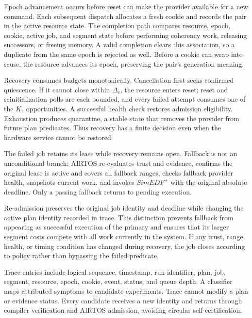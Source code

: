 \documentclass[lettersize,journal]{IEEEtran}
\begin{document}
Epoch advancement occurs before reset can make the provider available for a
new command. Each subsequent dispatch allocates a fresh cookie and records the
pair in the active resource state. The completion path compares resource,
epoch, cookie, active job, and segment state before performing coherency work,
releasing successors, or freeing memory. A valid completion clears this
association, so a duplicate from the same epoch is rejected as well. Before a
cookie can wrap into reuse, the resource advances its epoch, preserving the
pair's generation meaning.

Recovery consumes budgets monotonically. Cancellation first seeks confirmed
quiescence. If it cannot close within $\Delta_c$, the resource enters reset;
reset and reinitialization polls are each bounded, and every failed attempt
consumes one of the $K_r$ opportunities. A successful health check restores
admission eligibility. Exhaustion produces quarantine, a stable state that
removes the provider from future plan predicates. Thus recovery has a finite
decision even when the hardware service cannot be restored.

The failed job retains its lease while recovery remains open. Fallback is not
an unconditional branch: AIRTOS re-evaluates trust and evidence, confirms the
original lease is active and covers all fallback ranges, checks fallback
provider health, snapshots current work, and invokes $SimEDF^+$ with the
original absolute deadline. Only a passing fallback returns to pending
execution.

Re-admission preserves the original job identity and deadline while changing
the active plan identity recorded in trace. This distinction prevents fallback
from appearing as successful execution of the primary and ensures that its
larger segment costs compete with all work currently in the system. If any
trust, range, health, or timing condition has changed during recovery, the job
closes according to policy rather than bypassing the failed predicate.

Trace entries include logical sequence, timestamp, run identifier, plan, job,
segment, resource, epoch, cookie, event, status, and queue depth. A classifier
maps attributed symptoms to candidate experiments. Trace cannot modify a plan
or evidence status. Every candidate
receives a new identity and returns through compiler verification and AIRTOS
admission, avoiding circular self-certification.
\end{document}
